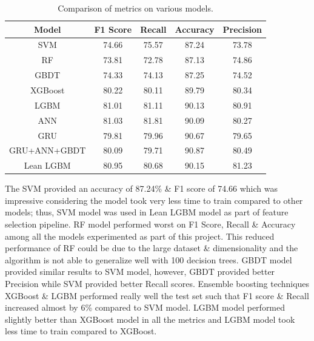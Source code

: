 \documentclass[twoside,11pt,a4paper]{article}
\begin{document}
\begin{table}[h]
	\begin{center}
		\begin{tabular}{|| c | c | c | c | c ||} 
			\hline
			Model & F1 Score & Recall & Accuracy & Precision \\ [0.5ex] 
			\hline\hline
			SVM	 & 74.66	& 75.57	& 87.24	& \cellcolor[HTML]{ff6666} 73.78 \\
			\hline
			RF	 & \cellcolor[HTML]{ff6666} 73.81	& \cellcolor[HTML]{ff6666} 72.78	& \cellcolor[HTML]{ff6666} 87.13	& 74.86 \\
			\hline
			GBDT	 & 74.33	& 74.13	& 87.25	& 74.52 \\
			\hline
			XGBoost	 & 80.22	& 80.11	& 89.79	& 80.34 \\
			\hline
			LGBM	 & 81.01	& 81.11	& 90.13	& 80.91 \\
			\hline
			ANN	 & \cellcolor[HTML]{339933} 81.03	&  \cellcolor[HTML]{339933} 81.81	& 90.09	& 80.27 \\
			\hline
			GRU	 & 79.81	& 79.96	& 90.67	& 79.65 \\
			\hline
			GRU+ANN+GBDT	 & 80.09	& 79.71	& \cellcolor[HTML]{339933} 90.87	& 80.49 \\
			\hline
			Lean LGBM	 & 80.95	& 80.68	& 90.15	& \cellcolor[HTML]{339933} 81.23 \\
			\hline
		\end{tabular}
		\caption{Comparison of metrics on various models.}
		\label{table:results}
	\end{center}
\end{table}

The \acs{SVM} provided an accuracy of 87.24\% \& F1 score of 74.66 which was impressive considering the model took very less time to train compared to other models; thus, \acs{SVM} model was used in Lean \acs{LGBM} model as part of feature selection pipeline. \acs{RF} model performed worst on F1 Score, Recall \& Accuracy among all the models experimented as part of this project. This reduced performance of \acs{RF} could be due to the large dataset \& dimensionality and the algorithm is not able to generalize well with 100 decision trees. \acs{GBDT} model provided similar results to \acs{SVM} model, however, \acs{GBDT} provided better Precision while \acs{SVM} provided better Recall scores. Ensemble boosting techniques \acs{XGBoost} \& \acs{LGBM} performed really well the test set such that F1 score \& Recall increased almost by  6\% compared to \acs{SVM} model. \acs{LGBM} model performed slightly better than \acs{XGBoost} model in all the metrics and \acs{LGBM} model took less time to train compared to \acs{XGBoost}.
\end{document}
